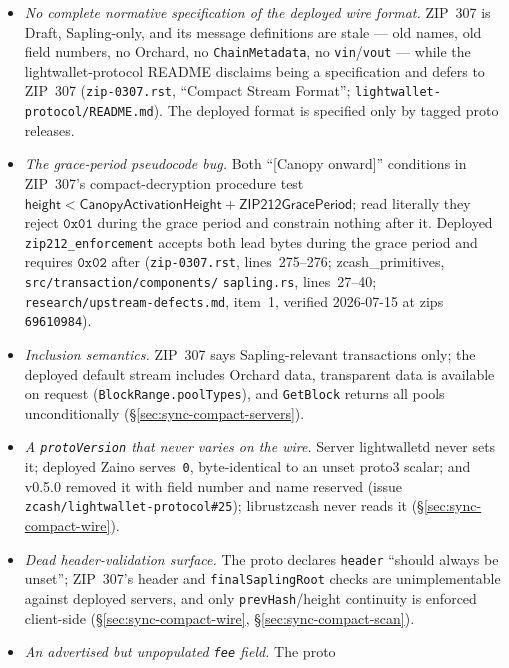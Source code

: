 \documentclass[11pt,a4paper]{article}
\theoremstyle{definition}
\begin{document}
\begin{itemize}
\item \emph{No complete normative specification of the deployed wire format.}
  ZIP~307 is Draft, Sapling-only, and its message definitions are stale ---
  old names, old field numbers, no Orchard, no \texttt{ChainMetadata}, no
  \texttt{vin}/\texttt{vout} --- while the \textsf{lightwallet-protocol}
  README disclaims being a specification and defers to ZIP~307
  (\texttt{zip-0307.rst}, ``Compact Stream Format'';
  \texttt{lightwallet-protocol/README.md}). The deployed format is
  specified only by tagged proto releases.
\item \emph{The grace-period pseudocode bug.} Both ``[Canopy onward]''
  conditions in ZIP~307's compact-decryption procedure test $\mathsf{height}
  < \mathsf{CanopyActivationHeight} + \mathsf{ZIP212GracePeriod}$; read
  literally they reject $\mathtt{0x01}$ during the grace period and
  constrain nothing after it. Deployed \texttt{zip212\_enforcement} accepts
  both lead bytes during the grace period and requires $\mathtt{0x02}$
  after (\texttt{zip-0307.rst}, lines~275--276;
  \textsf{zcash\_primitives},
  \texttt{src/transaction/}\allowbreak\texttt{components/}\allowbreak%
  \texttt{sapling.rs}, lines~27--40;
  \texttt{research/}\allowbreak\texttt{upstream-defects.md}, item~1,
  verified 2026-07-15 at \textsf{zips} \texttt{69610984}).
\item \emph{Inclusion semantics.} ZIP~307 says Sapling-relevant
  transactions only; the deployed default stream includes Orchard data,
  transparent data is available on request
  (\texttt{BlockRange.}\allowbreak\texttt{poolTypes}), and
  \texttt{GetBlock} returns all pools unconditionally
  (\S\ref{sec:sync-compact-servers}).
\item \emph{A \texttt{protoVersion} that never varies on the wire.}
  Server \textsf{lightwalletd} never sets it; deployed \textsf{Zaino}
  serves~\texttt{0}, byte-identical to an unset proto3 scalar; and
  v0.5.0 removed it with field number and name reserved
  (issue \texttt{zcash/lightwallet-protocol\#25}); \textsf{librustzcash}
  never reads it (\S\ref{sec:sync-compact-wire}).
\item \emph{Dead header-validation surface.} The proto declares
  \texttt{header} ``should always be unset''; ZIP~307's header and
  \texttt{finalSaplingRoot} checks are unimplementable against deployed
  servers, and only \texttt{prevHash}/height continuity is enforced
  client-side (\S\ref{sec:sync-compact-wire},
  \S\ref{sec:sync-compact-scan}).
\item \emph{An advertised but unpopulated \texttt{fee} field.} The proto

\end{itemize}
\end{document}
